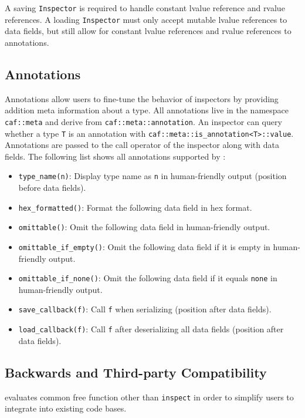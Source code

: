 A saving \lstinline^Inspector^ is required to handle constant lvalue reference and rvalue references. A loading \lstinline^Inspector^ must only accept mutable lvalue references to data fields, but still allow for constant lvalue references and rvalue references to annotations.

\subsection{Annotations}

Annotations allow users to fine-tune the behavior of inspectors by providing addition meta information about a type. All annotations live in the namespace \lstinline^caf::meta^ and derive from \lstinline^caf::meta::annotation^. An inspector can query whether a type \lstinline^T^ is an annotation with \lstinline^caf::meta::is_annotation<T>::value^. Annotations are passed to the call operator of the inspector along with data fields. The following list shows all annotations supported by \lib:

\begin{itemize}
\item \lstinline^type_name(n)^: Display type name as \lstinline^n^ in human-friendly output (position before data fields).
\item \lstinline^hex_formatted()^: Format the following data field in hex format.
\item \lstinline^omittable()^: Omit the following data field in human-friendly output.
\item \lstinline^omittable_if_empty()^: Omit the following data field if it is empty in human-friendly output.
\item \lstinline^omittable_if_none()^: Omit the following data field if it equals \lstinline^none^ in human-friendly output.
\item \lstinline^save_callback(f)^: Call \lstinline^f^ when serializing  (position after data fields).
\item \lstinline^load_callback(f)^: Call \lstinline^f^ after deserializing all data fields (position after data fields).
\end{itemize}

\subsection{Backwards and Third-party Compatibility}

\lib evaluates common free function other than \lstinline^inspect^ in order to simplify users to integrate \lib into existing code bases.

